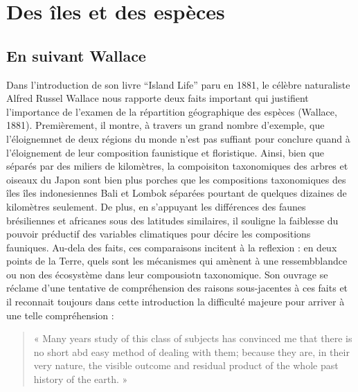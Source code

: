 \section*{Des îles et des espèces}\label{des-uxeeles-et-des-espuxe8ces}

\subsection*{En suivant Wallace}\label{en-suivant-wallace}

Dans l'introduction de son livre ``Island Life'' paru en 1881, le
célèbre naturaliste Alfred Russel Wallace nous rapporte deux faits
important qui justifient l'importance de l'examen de la répartition
géographique des espèces (Wallace, 1881). Premièrement, il montre, à
travers un grand nombre d'exemple, que l'éloignemnet de deux régions du
monde n'est pas suffiant pour conclure quand à l'éloignement de leur
composition faunistique et floristique. Ainsi, bien que séparés par des
miliers de kilomètres, la compoisiton taxonomiques des arbres et oiseaux
du Japon sont bien plus porches que les compositions taxonomiques des
îles îles indonesiennes Bali et Lombok séparées pourtant de quelques
dizaines de kilomètres seulement. De plus, en s'appuyant les différences
des faunes brésiliennes et africanes sous des latitudes similaires, il
souligne la faiblesse du pouvoir préductif des variables climatiques
pour décire les compositions fauniques. Au-dela des faits, ces
comparaisons incitent à la reflexion : en deux points de la Terre, quels
sont les mécanismes qui amènent à une ressembblandce ou non des
écosystème dans leur compousiotn taxonomique. Son ouvrage se réclame
d'une tentative de compréhension des raisons sous-jacentes à ces faits
et il reconnait toujours dans cette introduction la difficulté majeure
pour arriver à une telle compréhension :

\begin{quote}
« Many years study of this class of subjects has convinced me that there
is no short abd easy method of dealing with them; because they are, in
their very nature, the visible outcome and residual product of the whole
past history of the earth. »
\end{quote}

